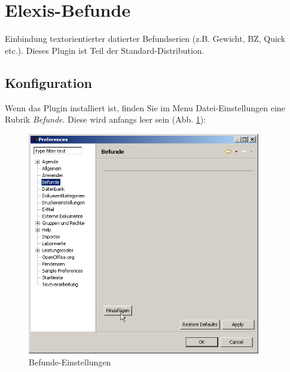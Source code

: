 \section{Elexis-Befunde}
Einbindung textorientierter datierter Befundserien (z.B. Gewicht, BZ, Quick etc.). Dieses Plugin ist Teil der Standard-Distribution.
\subsection{Konfiguration}

Wenn das Plugin installiert ist, finden Sie im Menu Datei-Einstellungen eine Rubrik \textit{Befunde}. Diese wird anfangs leer sein (Abb. \ref{fig:befundesettings}):
\begin{figure}[htp]
    \includegraphics[width=4in]{images/befunde1.png}
    \caption{Befunde-Einstellungen}\label{fig:befundesettings}
\end{figure}


